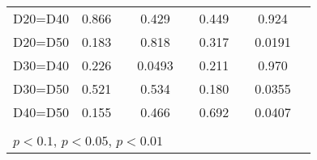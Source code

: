 \begin{tabular}{l|cccccc|cc}
D20=D40         &    0.866         &         &    0.429         &         &    0.449         &         &    0.924         &         \\
D20=D50         &    0.183         &         &    0.818         &         &    0.317         &         &   0.0191         &         \\
D30=D40         &    0.226         &         &   0.0493         &         &    0.211         &         &    0.970         &         \\
D30=D50         &    0.521         &         &    0.534         &         &    0.180         &         &   0.0355         &         \\
D40=D50         &    0.155         &         &    0.466         &         &    0.692         &         &   0.0407         &         \\
\hline\hline
\multicolumn{9}{p{16cm}}{\tiny }\\
\multicolumn{9}{l}{\tiny \sym{*} \(p<0.1\), \sym{**} \(p<0.05\), \sym{***} \(p<0.01\)}\\
\end{tabular}